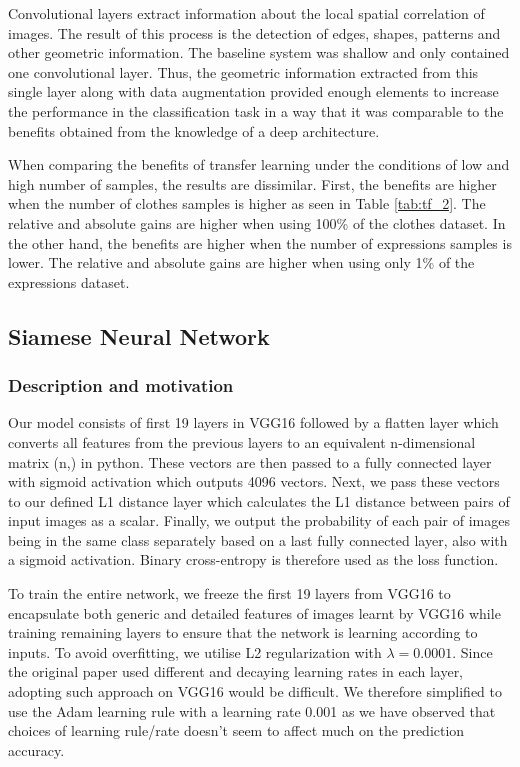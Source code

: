 \documentclass{article}
\begin{document}
Convolutional layers extract information about the local spatial correlation of images. The result of this process is the detection of edges, shapes, patterns and other geometric information. The baseline system was shallow and only contained one convolutional layer. Thus, the geometric information extracted from this single layer along with data augmentation provided enough elements to increase the performance in the classification task in a way that it was comparable to the benefits obtained from the knowledge of a deep architecture. 

When comparing the benefits of transfer learning under the conditions of low and high number of samples, the results are dissimilar. First, the benefits are higher when the number of clothes samples is higher as seen in Table \ref{tab:tf_2}. The relative and absolute gains are higher when using 100\% of the clothes dataset. In the other hand, the benefits are higher when the number of expressions samples is lower. The relative and absolute gains are higher when using only 1\% of the expressions dataset.

\subsection{Siamese Neural Network}

\subsubsection{\textbf{Description and motivation}}

Our model consists of first 19 layers in VGG16 followed by a flatten layer which converts all features from the previous layers to
an equivalent n-dimensional matrix (n,) in python. These vectors are then passed to a fully connected layer with sigmoid activation which outputs 4096 vectors. Next, we pass these vectors to our defined L1 distance layer which calculates the L1 distance between pairs of input images as a scalar. Finally, we output the probability of each pair of images being in the same class separately based on a last fully connected layer, also with a sigmoid activation. Binary cross-entropy is therefore used as the loss function.

To train the entire network, we freeze the first 19 layers from VGG16 to encapsulate both generic and detailed features of images learnt by VGG16 while training remaining layers to ensure that the network is learning according to inputs. To avoid overfitting, we utilise L2 regularization with $\lambda=0.0001$. Since the original paper used different and decaying learning rates in each layer, adopting such approach on VGG16 would be difficult. We therefore simplified to use the Adam learning rule with a learning rate 0.001 as we have observed that choices of learning rule/rate doesn't seem to affect much on the prediction accuracy.
\end{document}
